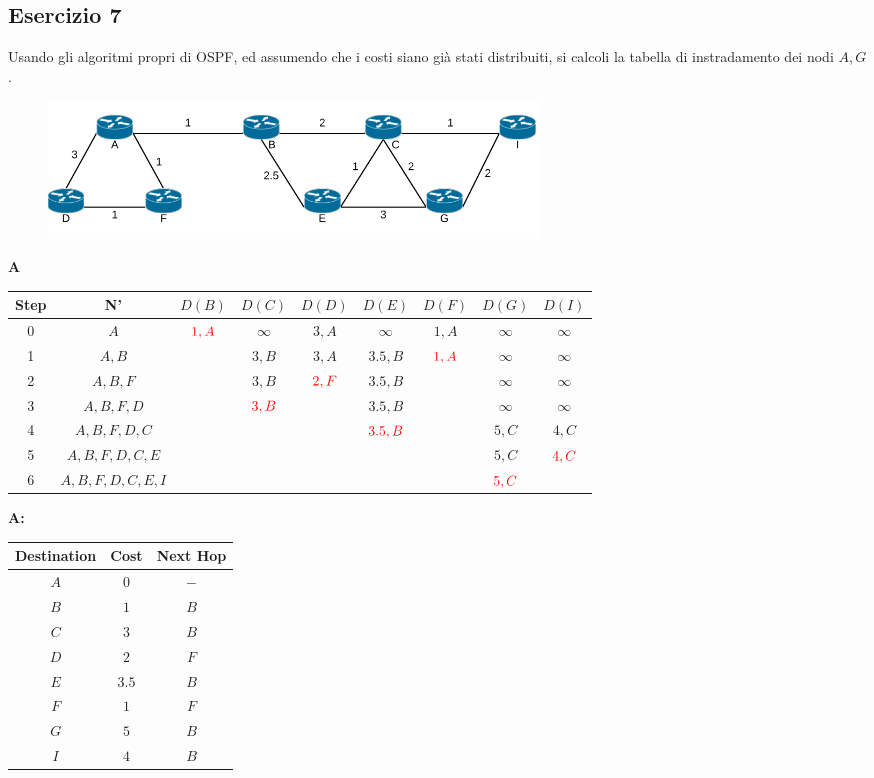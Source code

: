 \documentclass[10pt]{article}
\begin{document}
		\subsection{Esercizio 7}
			Usando gli algoritmi propri di OSPF, ed assumendo che i costi siano già stati distribuiti, si calcoli la tabella di instradamento dei nodi ${A,G}$.
			\begin{figure}[h]
				\centering
				\includegraphics[width=13cm]{es7}
			\end{figure}
			\begin{center}
				\textbf{A}
				\begin{tabular}{||c c c c c c c c c||} 
					\hline
					Step & N' & $D(B)$ & $D(C)$ & $D(D)$ & $D(E)$ & $D(F)$ & $D(G)$ & $D(I)$ \\
					\hline\hline
					0 & $A$ & $\color{red} 1,A$ & $\infty$ & $3,A$ & $\infty$ & $1,A$ & $\infty$ & $\infty$ \\
					\hline
					1 & $A,B$ & & $3,B$ & $3,A$ & $3.5,B$ & $\color{red} 1,A$ & $\infty$ & $\infty$ \\
					\hline
					2 & $A,B,F$ & & $3,B$ & $\color{red} 2,F$ & $3.5,B$ & & $\infty$ & $\infty$ \\
					\hline
					3 & $A,B,F,D$ & & $\color{red} 3,B$ & & $3.5,B$ & & $\infty$ & $\infty$ \\ 
					\hline
					4 & $A,B,F,D,C$ & & & & $\color{red} 3.5,B$ & & $5,C$ & $4,C$ \\
					\hline
					5 & $A,B,F,D,C,E$ & & & & & & $5,C$ & $\color{red} 4,C$ \\
					\hline
					6 & $A,B,F,D,C,E,I$ & & & & & & $\color{red} 5,C$ & \\[0.5ex]
					\hline
				\end{tabular}
			\end{center}
			\begin{center}
				\textbf{A:}
				\begin{tabular}{||c || c || c||}
					\hline
					Destination & Cost & Next Hop \\ [0.5ex] 
					\hline\hline
					$A$ & $0$ & $-$ \\
					$B$ & $1$ & $B$ \\
					$C$ & $3$ & $B$ \\
					$D$ & $2$ & $F$ \\
					$E$ & $3.5$ & $B$ \\
					$F$ & $1$ & $F$ \\
					$G$ & $5$ & $B$ \\
					$I$ & $4$ & $B$ \\[0.5ex] 
					\hline
				\end{tabular}
			\end{center}	
			
\end{document}
